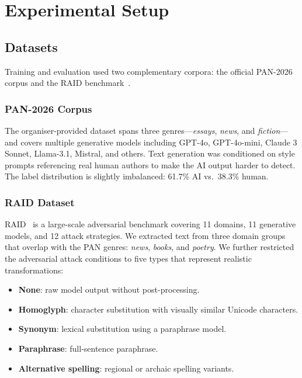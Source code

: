 
\section{Experimental Setup}
\label{sec:experiments}

\subsection{Datasets}

Training and evaluation used two complementary corpora: the official PAN-2026 corpus and the RAID benchmark~\cite{dugan:2024}.

\subsubsection{PAN-2026 Corpus}
The organiser-provided dataset spans three genres—\textit{essays}, \textit{news}, and \textit{fiction}—and covers multiple generative models including GPT-4o, GPT-4o-mini, Claude 3 Sonnet, Llama-3.1, Mistral, and others. Text generation was conditioned on style prompts referencing real human authors to make the AI output harder to detect. The label distribution is slightly imbalanced: 61.7\% AI vs.\ 38.3\% human.

\subsubsection{RAID Dataset}
RAID~\cite{dugan:2024} is a large-scale adversarial benchmark covering 11 domains, 11 generative models, and 12 attack strategies. We extracted text from three domain groups that overlap with the PAN genres: \textit{news}, \textit{books}, and \textit{poetry}. We further restricted the adversarial attack conditions to five types that represent realistic transformations:
\begin{itemize}
  \item \textbf{None}: raw model output without post-processing.
  \item \textbf{Homoglyph}: character substitution with visually similar Unicode characters.
  \item \textbf{Synonym}: lexical substitution using a paraphrase model.
  \item \textbf{Paraphrase}: full-sentence paraphrase.
  \item \textbf{Alternative spelling}: regional or archaic spelling variants.
\end{itemize}

